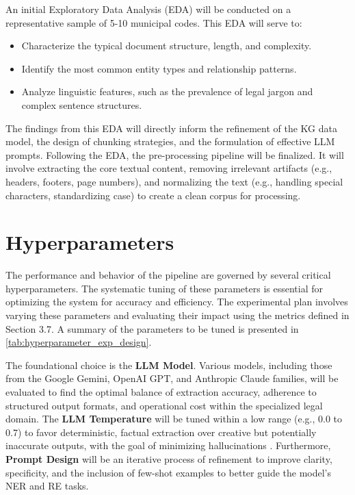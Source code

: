 An initial Exploratory Data Analysis (EDA) will be conducted on a representative sample of 5-10 municipal codes. This EDA will serve to:
\begin{itemize}
    \item Characterize the typical document structure, length, and complexity.
    \item Identify the most common entity types and relationship patterns.
    \item Analyze linguistic features, such as the prevalence of legal jargon and complex sentence structures.
\end{itemize}
The findings from this EDA will directly inform the refinement of the KG data model, the design of chunking strategies, and the formulation of effective LLM prompts. Following the EDA, the pre-processing pipeline will be finalized. It will involve extracting the core textual content, removing irrelevant artifacts (e.g., headers, footers, page numbers), and normalizing the text (e.g., handling special characters, standardizing case) to create a clean corpus for processing.

\section{Hyperparameters}
The performance and behavior of the pipeline are governed by several critical hyperparameters. The systematic tuning of these parameters is essential for optimizing the system for accuracy and efficiency. The experimental plan involves varying these parameters and evaluating their impact using the metrics defined in Section 3.7. A summary of the parameters to be tuned is presented in \cref{tab:hyperparameter_exp_design}.

The foundational choice is the \textbf{LLM Model}. Various models, including those from the Google Gemini, OpenAI GPT, and Anthropic Claude families, will be evaluated to find the optimal balance of extraction accuracy, adherence to structured output formats, and operational cost within the specialized legal domain. The \textbf{LLM Temperature} will be tuned within a low range (e.g., 0.0 to 0.7) to favor deterministic, factual extraction over creative but potentially inaccurate outputs, with the goal of minimizing hallucinations \parencite{RefWorks:RefID:96-rzepka2023expert}. Furthermore, \textbf{Prompt Design} will be an iterative process of refinement to improve clarity, specificity, and the inclusion of few-shot examples to better guide the model's NER and RE tasks.


